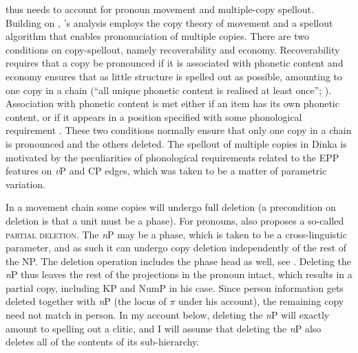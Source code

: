 \documentclass[output=paper,colorlinks,citecolor=brown]{langscibook}
\begin{document}
\ea \label{dinkabor}
\z \z

\noindent {} thus needs to account for pronoun movement and multiple-copy spellout. Building on \citet{landau06}, \citeauthor{vanurkpronouns}'s analysis employs the copy theory of movement and a spellout algorithm that enables prononuciation of multiple copies. There are two conditions on copy-spellout, namely recoverability and economy. Recoverability requires that a copy be pronounced if it is associated with phonetic content and economy ensures that as little structure is spelled out as possible, amounting to one copy in a chain (``all unique phonetic content is realised at least once''; \citealt[964]{vanurkpronouns}). Association with phonetic content is met either if an item has its own phonetic content, or if it appears in a position specified with some phonological requirement \citep[31]{landau06}. These two conditions normally ensure that only one copy in a chain is pronounced and the others deleted. The spellout of multiple copies in Dinka is motivated by the peculiarities of phonological requirements related to the EPP features on \textit{v}P and CP edges, which was taken to be a matter of parametric variation.

In a movement chain some copies will undergo full deletion (a precondition on deletion is that a unit must be a phase). For pronouns, \citeauthor{vanurkpronouns} also proposes a so-called \textsc{partial deletion}. The \textit{n}P may be a phase, which is taken to be a cross-linguistic parameter, and as such it can undergo copy deletion independently of the rest of the NP. The deletion operation includes the phase head as well, see \citet[968f.]{vanurkpronouns}. Deleting the \textit{n}P thus leaves the rest of the projections in the pronoun intact, which results in a partial copy, including KP and NumP in his case. Since person information gets deleted together with \textit{n}P (the locus of $\pi$ under his account), the remaining copy need not match in person. In my account below, deleting the \textit{n}P will exactly amount to spelling out a clitic, and I will assume that deleting the \textit{n}P also deletes all of the contents of its sub-hierarchy. 
\end{document}
